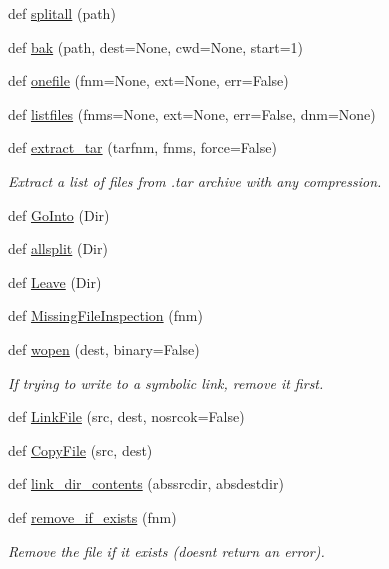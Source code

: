 \begin{DoxyCompactItemize}
def \hyperlink{namespacesrc_1_1nifty_aa4d2210e790bb92cc7f751ef306bb1c8}{splitall} (path)
\item 
def \hyperlink{namespacesrc_1_1nifty_a4b61f227cf823453229a7c1b98c24e5d}{bak} (path, dest=None, cwd=None, start=1)
\item 
def \hyperlink{namespacesrc_1_1nifty_aa751e61b12e5549898f8e1b03c3cb74b}{onefile} (fnm=None, ext=None, err=False)
\item 
def \hyperlink{namespacesrc_1_1nifty_a127cb144279f51ac1078d210631aeaf7}{listfiles} (fnms=None, ext=None, err=False, dnm=None)
\item 
def \hyperlink{namespacesrc_1_1nifty_aa4ad24733c5e9b18cbc53d182575222f}{extract\+\_\+tar} (tarfnm, fnms, force=False)
\begin{DoxyCompactList}\small\item\em Extract a list of files from .tar archive with any compression. \end{DoxyCompactList}\item 
def \hyperlink{namespacesrc_1_1nifty_ac5445375fcdc5825bb874014b04c45d7}{Go\+Into} (Dir)
\item 
def \hyperlink{namespacesrc_1_1nifty_a18cbb1a44578e68dde486deac3089f77}{allsplit} (Dir)
\item 
def \hyperlink{namespacesrc_1_1nifty_adef15c0f6efffef55b8c8212d5722d78}{Leave} (Dir)
\item 
def \hyperlink{namespacesrc_1_1nifty_a39a23ca3b83aadd4bfdf3eee9abb3257}{Missing\+File\+Inspection} (fnm)
\item 
def \hyperlink{namespacesrc_1_1nifty_a82f89e3045bdeed09a928bb9ce8b0dc1}{wopen} (dest, binary=False)
\begin{DoxyCompactList}\small\item\em If trying to write to a symbolic link, remove it first. \end{DoxyCompactList}\item 
def \hyperlink{namespacesrc_1_1nifty_a7fd3a0edb0212c320360d7685227b0f5}{Link\+File} (src, dest, nosrcok=False)
\item 
def \hyperlink{namespacesrc_1_1nifty_a688498187c471801b1e64fd7f4e35424}{Copy\+File} (src, dest)
\item 
def \hyperlink{namespacesrc_1_1nifty_a5592cf01ab24cb101579643160ce72cf}{link\+\_\+dir\+\_\+contents} (abssrcdir, absdestdir)
\item 
def \hyperlink{namespacesrc_1_1nifty_ae667a525ff42b8bca1fc20024c7a5f5c}{remove\+\_\+if\+\_\+exists} (fnm)
\begin{DoxyCompactList}\small\item\em Remove the file if it exists (doesn\textquotesingle{}t return an error). \end{DoxyCompactList}\item 

\end{DoxyCompactItemize}
